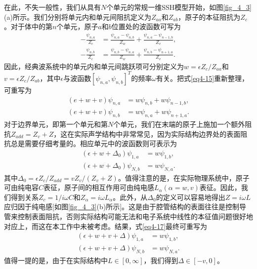 在此，不失一般性，我们从具有\(N\)个单元的常规一维SSH模型开始，如图\ref{fig_4_3}(a)所示。我们分别将单元内和单元间阻抗定义为\(Z_{aa}\)和\(Z_{ab}\)，原子的本征阻抗为\(Z_{c}\)。对于体中的第\(n\)个单元，原子\(a\)和\(b\)位置处的波函数可写为
\begin{equation}\label{eq4-15}
    \begin{split}
    -\frac{\psi_{n,a}}{Z_{c}} &= \frac{\psi_{n,a} - \psi_{n,b}}{Z_{w}} + \frac{\psi_{n,a} - \psi_{n - 1,b}}{Z_{v}},\\
    -\frac{\psi_{n,b}}{Z_{c}} &= \frac{\psi_{n,b} - \psi_{n,a}}{Z_{w}} + \frac{\psi_{n,b} - \psi_{n + 1,a}}{Z_{v}}.
    \end{split}
\end{equation}
因此，经典波系统中的单元内和单元间跳跃项可分别定义为\(w = \epsilon Z_{c} / Z_{aa}\)和\(v = \epsilon Z_{c} / Z_{ab}\)，其中\(\epsilon\)与波函数\([\psi_{n,a},\psi_{n,b}]^T\)的频率\(\omega\)有关。把式\ref{eq4-15}重新整理，可重写为
\begin{equation}\label{eq4-16}
    \begin{split}
    (e + w + v)\psi_{n,a} &= w\psi_{n,b} + w\psi_{n - 1,b},\\
    (e + w + v)\psi_{n,b} &= w\psi_{n,a} + w\psi_{n + 1,a}.
    \end{split}
\end{equation}
对于边界单元，即第一个单元和第\(N\)个单元，我们在末端的原子上施加一个额外阻抗\(Z_{add}=Z_{v}+Z\)，这在实际声学结构中非常常见，因为实际结构边界处的表面阻抗总是需要仔细考量的。相应单元中的波函数则可表示为
\begin{equation}\label{eq4-17}
    \begin{split}
    (\epsilon + w + \Delta_0)\psi_{1,a} &= w\psi_{1,b},\\
    (\epsilon + w + \Delta_0)\psi_{N,b} &= w\psi_{N,a}.
    \end{split}
    \end{equation}
其中\(\Delta_0 = \epsilon Z_{c} / Z_{add} = vZ_{v} / (Z_{v} + Z)\)。值得注意的是，在实际物理系统中，原子可由纯电容\(C\)表征，原子间的相互作用可由纯电感\(L_{\alpha}(\alpha = w,v)\)表征。因此，我们得到关系\(Z_{c} = 1 / i\omega C\)和\(Z_{\alpha} = i\omega L_{\alpha}\)。此外，从\(\Delta_0\)的定义可以容易地得出\(Z = i\omega L\)应归因于纯电感[如图\ref{fig_4_3}(b)所示]。这是由于腔管结构的表面往往是控制导管来控制表面阻抗，否则实际结构可能无法和电子系统中线性的本征值问题很好地对应上，而这在本工作中未被考虑。结果，式\ref{eq4-17}最终可重写为
\begin{equation}\label{eq4-18}
    \begin{split}
    (\epsilon + w + v + \Delta)\psi_{1,a} &= w\psi_{1,b},\\
    (\epsilon + w + v + \Delta)\psi_{N,b} &= w\psi_{N,a}.
    \end{split}
\end{equation}
值得一提的是，由于在实际结构中\(L \in [0,\infty]\)，我们得到\(\Delta \in [-v,0]\)。


